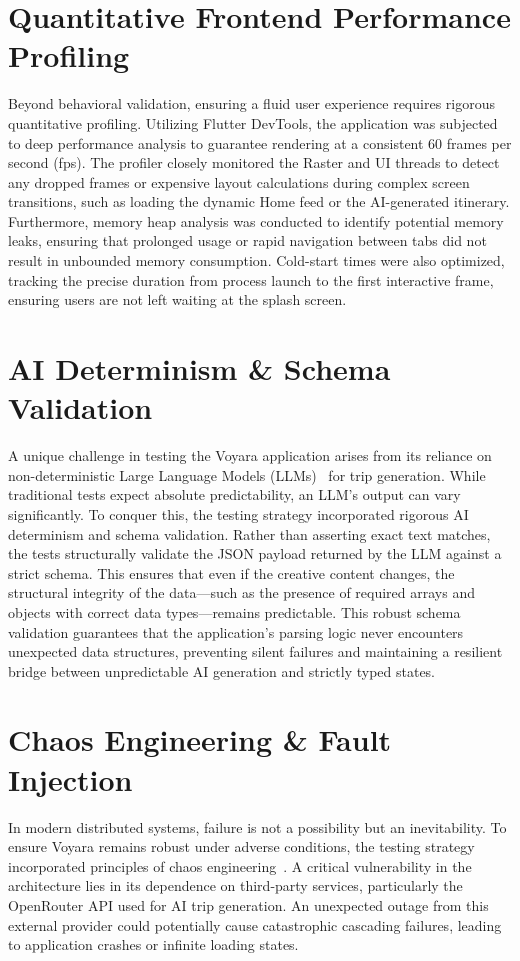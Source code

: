 \section{Quantitative Frontend Performance Profiling}
Beyond behavioral validation, ensuring a fluid user experience requires rigorous quantitative profiling. Utilizing Flutter DevTools, the application was subjected to deep performance analysis to guarantee rendering at a consistent 60 frames per second (fps). The profiler closely monitored the Raster and UI threads to detect any dropped frames or expensive layout calculations during complex screen transitions, such as loading the dynamic Home feed or the AI-generated itinerary. Furthermore, memory heap analysis was conducted to identify potential memory leaks, ensuring that prolonged usage or rapid navigation between tabs did not result in unbounded memory consumption. Cold-start times were also optimized, tracking the precise duration from process launch to the first interactive frame, ensuring users are not left waiting at the splash screen.

\section{AI Determinism \& Schema Validation}
A unique challenge in testing the Voyara application arises from its reliance on non-deterministic Large Language Models (LLMs)~\cite{llm_overview} for trip generation. While traditional tests expect absolute predictability, an LLM's output can vary significantly. To conquer this, the testing strategy incorporated rigorous AI determinism and schema validation. Rather than asserting exact text matches, the tests structurally validate the JSON payload returned by the LLM against a strict schema. This ensures that even if the creative content changes, the structural integrity of the data---such as the presence of required arrays and objects with correct data types---remains predictable. This robust schema validation guarantees that the application's parsing logic never encounters unexpected data structures, preventing silent failures and maintaining a resilient bridge between unpredictable AI generation and strictly typed states.

\section{Chaos Engineering \& Fault Injection}
In modern distributed systems, failure is not a possibility but an inevitability. To ensure Voyara remains robust under adverse conditions, the testing strategy incorporated principles of chaos engineering~\cite{chaos_engineering}. A critical vulnerability in the architecture lies in its dependence on third-party services, particularly the OpenRouter API used for AI trip generation. An unexpected outage from this external provider could potentially cause catastrophic cascading failures, leading to application crashes or infinite loading states.

